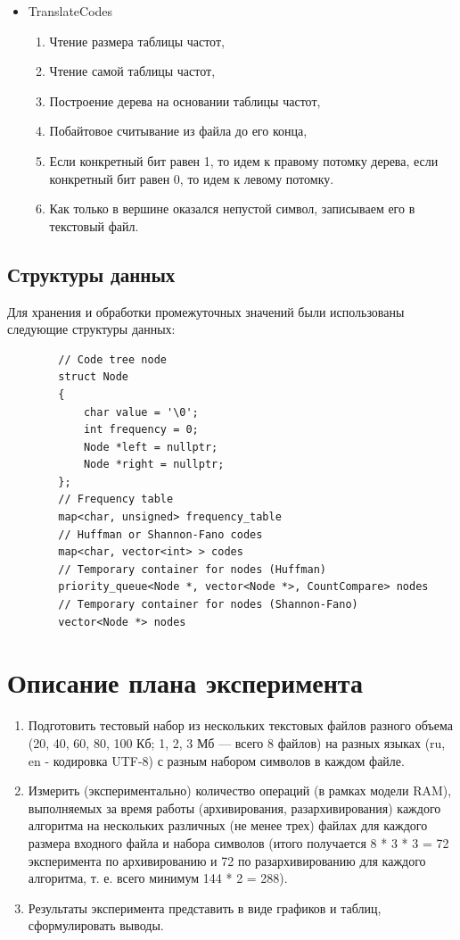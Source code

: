 \documentclass[a4paper,12pt]{article} %
\begin{document}
\begin{itemize}
        \item TranslateCodes
        \begin{enumerate}
            \item
            Чтение размера таблицы частот,
            \item
            Чтение самой таблицы частот,
            \item
            Построение дерева на основании таблицы частот,
            \item
            Побайтовое считывание из файла до его конца,
            \item
            Если конкретный бит равен 1, то идем к правому потомку дерева,
            если конкретный бит равен 0, то идем к левому потомку.
            \item
            Как только в вершине оказался непустой символ, записываем его в текстовый файл.
        \end{enumerate}
    \end{itemize}
    \newpage
    \subsection{Структуры данных}
    Для хранения и обработки промежуточных значений были использованы следующие
    структуры данных:
    \begin{lstlisting}
        // Code tree node
        struct Node
        {
            char value = '\0';
            int frequency = 0;
            Node *left = nullptr;
            Node *right = nullptr;
        };
        // Frequency table
        map<char, unsigned> frequency_table
        // Huffman or Shannon-Fano codes
        map<char, vector<int> > codes 
        // Temporary container for nodes (Huffman)
        priority_queue<Node *, vector<Node *>, CountCompare> nodes
        // Temporary container for nodes (Shannon-Fano)
        vector<Node *> nodes
    \end{lstlisting}
    \newpage
    
    \section{Описание плана эксперимента}
    \begin{enumerate}
        \item 
        Подготовить тестовый набор из нескольких текстовых файлов разного объема
        (20, 40, 60, 80, 100 Кб; 1, 2, 3 Мб — всего 8 файлов) на разных языках (ru, en -
        кодировка UTF-8) с разным набором символов в каждом файле.
        \item
        Измерить (экспериментально) количество операций (в рамках модели
        RAM), выполняемых за время работы (архивирования,
        разархивирования) каждого алгоритма на нескольких различных
        (не менее трех) файлах для каждого размера входного файла
        и набора символов (итого получается 8 * 3 * 3 = 72 эксперимента
        по архивированию и 72 по разархивированию для каждого алгоритма,
        т. е. всего минимум 144 * 2 = 288).
        \item
        Результаты эксперимента представить в виде графиков и таблиц, сформулировать выводы.
    \end{enumerate}
    \newpage
\end{document}
